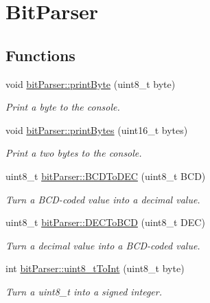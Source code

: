 \hypertarget{group__bit_parser}{}\section{Bit\+Parser}
\label{group__bit_parser}
\subsection*{Functions}
\begin{DoxyCompactItemize}
\item 
void \mbox{\hyperlink{group__bit_parser_ga59838a77502d6d7f71258ff348055510}{bit\+Parser\+::print\+Byte}} (uint8\+\_\+t byte)
\begin{DoxyCompactList}\small\item\em Print a byte to the console. \end{DoxyCompactList}\item 
void \mbox{\hyperlink{group__bit_parser_ga25b5179d0eec3cf5d3f465c7b2c179b6}{bit\+Parser\+::print\+Bytes}} (uint16\+\_\+t bytes)
\begin{DoxyCompactList}\small\item\em Print a two bytes to the console. \end{DoxyCompactList}\item 
uint8\+\_\+t \mbox{\hyperlink{group__bit_parser_gad207f006665a21b8cbdb0148d81b80c1}{bit\+Parser\+::\+B\+C\+D\+To\+D\+EC}} (uint8\+\_\+t B\+CD)
\begin{DoxyCompactList}\small\item\em Turn a B\+C\+D-\/coded value into a decimal value. \end{DoxyCompactList}\item 
uint8\+\_\+t \mbox{\hyperlink{group__bit_parser_gabf889c80952fe124c224fd61c59704d1}{bit\+Parser\+::\+D\+E\+C\+To\+B\+CD}} (uint8\+\_\+t D\+EC)
\begin{DoxyCompactList}\small\item\em Turn a decimal value into a B\+C\+D-\/coded value. \end{DoxyCompactList}\item 
int \mbox{\hyperlink{group__bit_parser_ga2cdf3099581569732367d0fc965e0a7e}{bit\+Parser\+::uint8\+\_\+t\+To\+Int}} (uint8\+\_\+t byte)
\begin{DoxyCompactList}\small\item\em Turn a uint8\+\_\+t into a signed integer. \end{DoxyCompactList}\end{DoxyCompactItemize}
